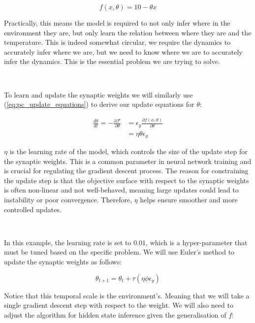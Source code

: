 \documentclass{article}
\newcommand{\refp}[1]{(\ref{#1})}
\begin{document}
\begin{equation}
	f(x, \theta) = 10 - \theta x
\end{equation}

Practically, this means the model is required to not only infer where in the environment they are, but only learn the relation between where they are and the temperature. This is indeed somewhat circular, we require the dynamics to accurately infer where we are, but we need to know where we are to accurately infer the dynamics. This is the essential problem we are trying to solve. 

\

To learn and update the synaptic weights we will similarly use \refp{eq:pc_update_equations} to derive our update equations for $\theta$:

\begin{equation}\label{eq:theta_gradient_descent}
	\begin{aligned}
		\frac{d \theta}{dt} = - \frac{\partial \mathcal{F}}{\partial \theta}  &= \epsilon_y \frac{\partial f(\phi, \theta)}{\partial \theta} \\
		&= \eta \theta \epsilon_y
	\end{aligned}
\end{equation}

$\eta$ is the learning rate of the model, which controls the size of the update step for the synaptic weights. This is a common parameter in neural network training and is crucial for regulating the gradient descent process. The reason for constraining the update step is that the objective surface with respect to the synaptic weights is often non-linear and not well-behaved, meaning large updates could lead to instability or poor convergence. Therefore, $\eta$ helps ensure smoother and more controlled updates.

\

In this example, the learning rate is set to $0.01$, which is a hyper-parameter that must be tuned based on the specific problem. We will use Euler’s method to update the synaptic weights as follows:


\begin{equation*}
	\theta_{t + 1} = \theta_{t} + \tau ( \eta \phi \epsilon_y )
\end{equation*}

Notice that this temporal scale is the environment's. Meaning that we will take a single gradient descent step with respect to the weight. We will also need to adjust the algorithm for hidden state inference given the generalisation of $f$:
\end{document}
